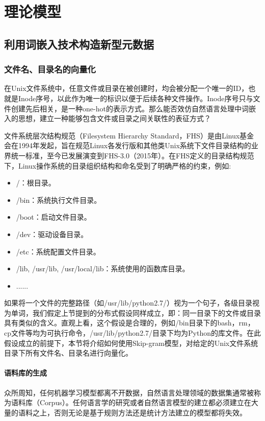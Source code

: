 \chapter{理论模型}
\section{利用词嵌入技术构造新型元数据}
\subsection{文件名、目录名的向量化}
在Unix文件系统中，任意文件或目录在被创建时，均会被分配一个唯一的ID，也就是Inode序号，以此作为唯一的标识以便于后续各种文件操作。Inode序号只与文件创建先后相关，是一种one-hot的表示方式。那么能否效仿自然语言处理中词嵌入的思想，建立一种能够包含文件或目录之间关联性的表征方式？

文件系统层次结构规范（Filesystem Hierarchy Standard，FHS）\cite{fhs}是由Linux基金会在1994年发起，旨在规范Linux各发行版和其他类Unix系统下文件目录结构的业界统一标准，至今已发展演变到FHS-3.0（2015年）。在FHS定义的目录结构规范下，Linux操作系统的目录组织结构和命名受到了明确严格的约束，例如:
\begin{itemize}
    \item /：根目录。
    \item /bin：系统执行文件目录。
    \item /boot：启动文件目录。
    \item /dev：驱动设备目录。
    \item /etc：系统配置文件目录。
    \item /lib, /usr/lib, /usr/local/lib：系统使用的函数库目录。
    \item ......
\end{itemize}

如果将一个文件的完整路径（如/usr/lib/python2.7/）视为一个句子，各级目录视为单词，我们假定上节提到的分布式假设同样成立，即：同一目录下的文件或目录具有类似的含义。直观上看，这个假设是合理的，例如/bin目录下的bash，rm，cp文件等均为可执行命令，/usr/lib/python2.7/目录下均为Python的库文件。在此假设成立的前提下，本节将介绍如何使用Skip-gram模型，对给定的Unix文件系统目录下所有文件名、目录名进行向量化。

\subsubsection*{语料库的生成}
众所周知，任何机器学习模型都离不开数据，自然语言处理领域的数据集通常被称为语料库（Corpus）。任何语言学的研究或者自然语言模型的建立都必须建立在大量的语料之上，否则无论是基于规则方法还是统计方法建立的模型都将失效。

